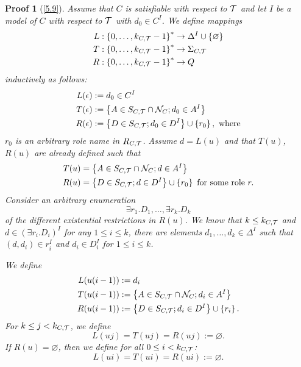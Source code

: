 \documentclass[openany]{scrbook}
\theoremstyle{break}
\theoremstyle{nonumberbreak}
\theoremstyle{nonumberplain}
\theoremstyle{nonumberbreak}
\newtheorem{Proof}{Proof}
\newcommand{\set}[1]{\left\{#1\right\}}
\begin{document}
\begin{Proof}[\cref{5.9}]
  Assume that $C$ is satisfiable with respect to ${\cal T}$ and let
  $I$ be a model of $C$ with respect to ${\cal T}$ with $d_0 \in
  C^I$. We define mappings
  \begin{align*}
    L: \set{0, \dotsc, k_{C, {\cal T}} - 1}^* & \to \Delta^I \cup
    \set{\varnothing} \\
    T: \set{0, \dotsc, k_{C, {\cal T}} - 1}^* & \to \Sigma_{C, {\cal
        T}} \\
    R: \set{0, \dotsc, k_{C, {\cal T}} - 1}^* & \to Q
  \end{align*}
  inductively as follows:
  \begin{align*}
    L(\epsilon) & := d_0 \in C^I \\
    T(\epsilon) & := \set{A \in S_{C, {\cal T}} \cap {\cal N}_C; d_0
      \in A^I} \\
    R(\epsilon) & := \set{D \in S_{C, {\cal T}}; d_0 \in D^I} \cup
    \set{r_0},\ \text{where}
  \end{align*}
  $r_0$ is an arbitrary role name in $R_{C, {\cal T}}$.
  Assume $d = L(u)$ and that $T(u)$, $R(u)$ are already defined such
  that
  \begin{align*}
    T(u) & = \set{A \in S_{C, {\cal T}} \cap {\cal N}_C; d \in A^I} \\
    R(u) & = \set{D \in S_{C, {\cal T}}; d \in D^I} \cup \set{r_0}\
    \text{for some role}\ r.
  \end{align*}
  Consider an arbitrary enumeration
  \begin{equation*}
    \exists r_1.D_1, \dotsc, \exists r_k.D_k
  \end{equation*}
  of the different existential restrictions in $R(u)$. We know that $k
  \leq k_{C, {\cal T}}$ and $d \in (\exists r_i. D_i)^I$ for any $1
  \leq i \leq k$, there are elements $d_1, \dotsc, d_k \in \Delta^I$
  such that $(d, d_i) \in r_i^I$ and $d_i \in D_i^I$ for $1 \leq i
  \leq k$.

  We define
  \begin{align*}
    L(u(i - 1)) & := d_i \\
    T(u(i - 1)) & := \set{A \in S_{C, {\cal T}} \cap {\cal N}_C; d_i
      \in A^I} \\
    R(u(i - 1)) & := \set{D \in S_{C, {\cal T}}; d_i \in D^I} \cup
    \set{r_i}.
  \end{align*}
  For $k \leq j < k_{C, {\cal T}}$, we define
  \begin{equation*}
    L(uj) = T(uj) = R(uj) := \varnothing.
  \end{equation*}
  If $R(u) = \varnothing$, then we define for all $0 \leq i < k_{C,
    {\cal T}}$:
  \begin{equation*}
    L(ui) = T(ui) = R(ui) := \varnothing.
  \end{equation*}


\end{Proof}
\end{document}
